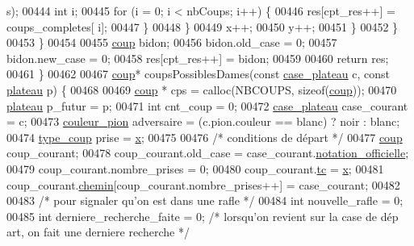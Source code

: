 \begin{DoxyCode}
      s);
00444                                         \textcolor{keywordtype}{int} i;
00445                                         \textcolor{keywordflow}{for} (i = 0; i < nbCoups; i++) \{
00446                                                 res[cpt\_res++] = coups\_completes[
      i];
00447                                         \}
00448                                 \}
00449                                 x++;
00450                                 y++;
00451                         \}
00452                 \}
00453         \}
00454 
00455         \hyperlink{structcoup}{coup} bidon;
00456         bidon.old\_case = 0;
00457         bidon.new\_case = 0;
00458         res[cpt\_res++] = bidon;
00459 
00460         \textcolor{keywordflow}{return} res;
00461 \}
00462 
00467 \hyperlink{structcoup}{coup}* coupsPossiblesDames(\textcolor{keyword}{const} \hyperlink{structcase__plateau}{case_plateau} c, \textcolor{keyword}{const} \hyperlink{structplateau}{plateau} p) \{
00468 
00469         \hyperlink{structcoup}{coup} * cps = calloc(NBCOUPS, \textcolor{keyword}{sizeof}(\hyperlink{structcoup}{coup}));
00470         \hyperlink{structplateau}{plateau} p\_futur = p;
00471         \textcolor{keywordtype}{int} cnt\_coup = 0;
00472         \hyperlink{structcase__plateau}{case_plateau} case\_courant = c;
00473         \hyperlink{plateau_8h_a8282be6127518547fa916dd6cfef17cb}{couleur_pion} adversaire = (c.pion.couleur == blanc) ? noir : blanc;
00474         \hyperlink{plateau_8h_a9e00f85b4b6ec2d8bdfbe94ff40f0eee}{type_coup} prise = \hyperlink{plateau_8h_a9e00f85b4b6ec2d8bdfbe94ff40f0eeeacab1e15e82c5976bfb476ddfe145263c}{x};
00475 
00476         \textcolor{comment}{/* conditions de départ */}
00477         \hyperlink{structcoup}{coup} coup\_courant;
00478         coup\_courant.old\_case = case\_courant.\hyperlink{structcase__plateau_ad510581b324604a9cf685cbb769a421a}{notation_officielle};
00479         coup\_courant.nombre\_prises = 0;
00480         coup\_courant.\hyperlink{structcoup_aa33da004dccb192cb33bc00c26c6e859}{tc} = \hyperlink{plateau_8h_a9e00f85b4b6ec2d8bdfbe94ff40f0eeeacab1e15e82c5976bfb476ddfe145263c}{x};
00481         coup\_courant.\hyperlink{structcoup_aa66b88eb8140c2f459ac92fad0796510}{chemin}[coup\_courant.nombre\_prises++] = case\_courant;
00482 
00483         \textcolor{comment}{/* pour signaler qu'on est dans une rafle */}
00484         \textcolor{keywordtype}{int} nouvelle\_rafle = 0;
00485         \textcolor{keywordtype}{int} derniere\_recherche\_faite = 0; \textcolor{comment}{/* lorsqu'on revient sur la case de dép
      art, on fait une derniere recherche */}

\end{DoxyCode}
